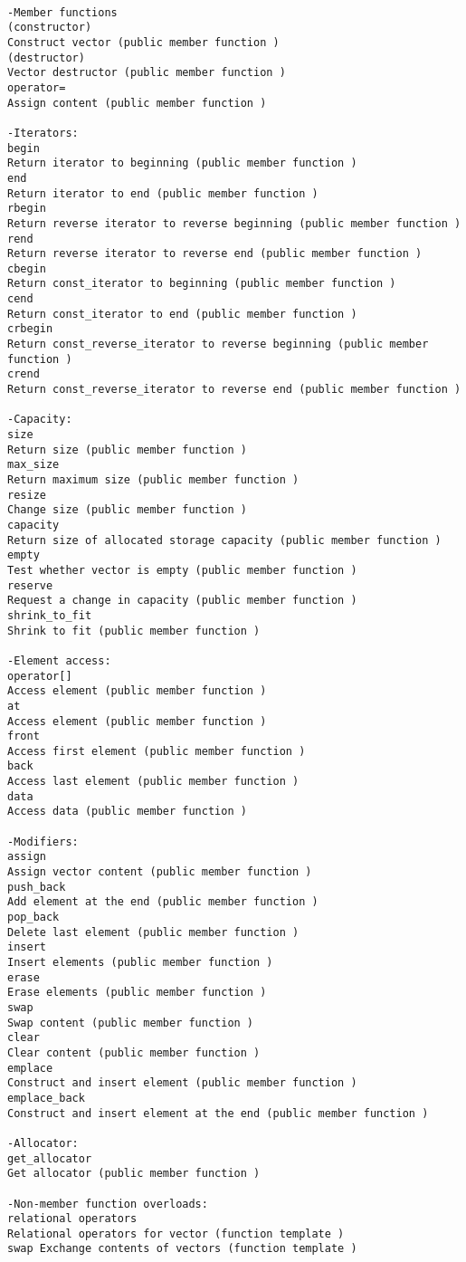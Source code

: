 \begin{verbatim}

-Member functions
(constructor)
Construct vector (public member function )
(destructor)
Vector destructor (public member function )
operator=
Assign content (public member function )

-Iterators:
begin
Return iterator to beginning (public member function )
end
Return iterator to end (public member function )
rbegin
Return reverse iterator to reverse beginning (public member function )
rend
Return reverse iterator to reverse end (public member function )
cbegin 
Return const_iterator to beginning (public member function )
cend 
Return const_iterator to end (public member function )
crbegin 
Return const_reverse_iterator to reverse beginning (public member function )
crend 
Return const_reverse_iterator to reverse end (public member function )

-Capacity:
size
Return size (public member function )
max_size
Return maximum size (public member function )
resize
Change size (public member function )
capacity
Return size of allocated storage capacity (public member function )
empty
Test whether vector is empty (public member function )
reserve
Request a change in capacity (public member function )
shrink_to_fit 
Shrink to fit (public member function )

-Element access:
operator[]
Access element (public member function )
at
Access element (public member function )
front
Access first element (public member function )
back
Access last element (public member function )
data 
Access data (public member function )

-Modifiers:
assign
Assign vector content (public member function )
push_back
Add element at the end (public member function )
pop_back
Delete last element (public member function )
insert
Insert elements (public member function )
erase
Erase elements (public member function )
swap
Swap content (public member function )
clear
Clear content (public member function )
emplace 
Construct and insert element (public member function )
emplace_back 
Construct and insert element at the end (public member function )

-Allocator:
get_allocator
Get allocator (public member function )

-Non-member function overloads:
relational operators
Relational operators for vector (function template )
swap Exchange contents of vectors (function template )
\end{verbatim}
